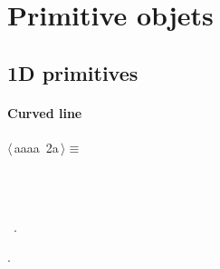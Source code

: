 \documentclass[11pt,oneside]{article}	%
\begin{document}
\section{Primitive objets}
\subsection{1D primitives}

\paragraph{Curved line}
\begin{flushleft} \small \label{scrap2}
\protect{}$\langle\,$aaaa\nobreak\ {\footnotesize 2a}$\,\rangle\equiv$
\vspace{-1ex}
\begin{list}{}{} \item
\mbox{}\verb@@\\
\mbox{}\verb@@\\
\mbox{}\verb@@{\NWsep}
\end{list}
\vspace{-1ex}
\footnotesize\addtolength{\baselineskip}{-1ex}
\begin{list}{}{\setlength{\itemsep}{-\parsep}\setlength{\itemindent}{-\leftmargin}}
\item \NWtxtMacroDefBy\ .
\item {\NWtxtMacroNoRef}.
\end{list}
\end{flushleft}
\end{document}
